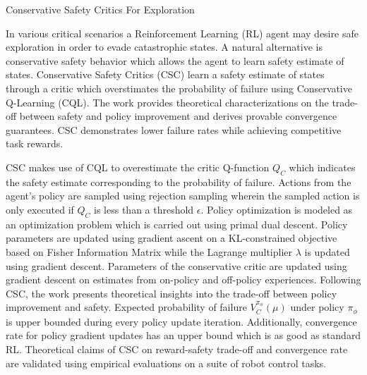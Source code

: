 \documentclass[11pt,letterpaper]{article}
\begin{document}
\begin{center}
  \large{Conservative Safety Critics For Exploration}
\end{center}

In various critical scenarios a Reinforcement Learning (RL) agent may desire safe exploration in order to evade catastrophic states. A natural alternative is conservative safety behavior which allows the agent to learn safety estimate of states. Conservative Safety Critics (CSC) learn a safety estimate of states through a critic which overstimates the probability of failure using Conservative Q-Learning (CQL). The work provides theoretical characterizations on the trade-off between safety and policy improvement and derives provable convergence guarantees. CSC demonstrates lower failure rates while achieving competitive task rewards. 

CSC makes use of CQL to overestimate the critic Q-function $Q_{C}$ which indicates the safety estimate corresponding to the probability of failure. Actions from the agent's policy are sampled using rejection sampling wherein the sampled action is only executed if $Q_{C}$ is less than a threshold $\epsilon$. Policy optimization is modeled as an optimization problem which is carried out using primal dual descent. Policy parameters are updated using gradient ascent on a KL-constrained objective based on Fisher Information Matrix while the Lagrange multiplier $\lambda$ is updated using gradient descent. Parameters of the conservative critic are updated using gradient descent on estimates from on-policy and off-policy experiences. Following CSC, the work presents theoretical insights into the trade-off between policy improvement and safety. Expected probability of failure $V_{C}^{\pi_{\phi}}(\mu)$ under policy $\pi_{\phi}$ is upper bounded during every policy update iteration. Additionally, convergence rate for policy gradient updates has an upper bound which is as good as standard RL. Theoretical claims of CSC on reward-safety trade-off and convergence rate are validated using empirical evaluations on a suite of robot control tasks. 
\end{document}
